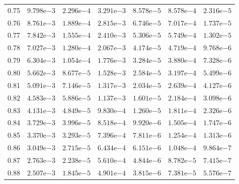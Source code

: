 \begin{table}[htb!]
\begin{tabular}{|c|cc|cc|cc|}
0.75 & $9.798\mathrm{e}{-3}$ & $2.296\mathrm{e}{-4}$ & $3.291\mathrm{e}{-3}$ & $8.578\mathrm{e}{-5}$ & $8.578\mathrm{e}{-4}$ & $2.316\mathrm{e}{-5}$ \\
0.76 & $8.761\mathrm{e}{-3}$ & $1.889\mathrm{e}{-4}$ & $2.815\mathrm{e}{-3}$ & $6.746\mathrm{e}{-5}$ & $7.017\mathrm{e}{-4}$ & $1.737\mathrm{e}{-5}$ \\
0.77 & $7.842\mathrm{e}{-3}$ & $1.555\mathrm{e}{-4}$ & $2.410\mathrm{e}{-3}$ & $5.306\mathrm{e}{-5}$ & $5.749\mathrm{e}{-4}$ & $1.302\mathrm{e}{-5}$ \\
0.78 & $7.027\mathrm{e}{-3}$ & $1.280\mathrm{e}{-4}$ & $2.067\mathrm{e}{-3}$ & $4.174\mathrm{e}{-5}$ & $4.719\mathrm{e}{-4}$ & $9.768\mathrm{e}{-6}$ \\
0.79 & $6.304\mathrm{e}{-3}$ & $1.054\mathrm{e}{-4}$ & $1.776\mathrm{e}{-3}$ & $3.284\mathrm{e}{-5}$ & $3.880\mathrm{e}{-4}$ & $7.328\mathrm{e}{-6}$ \\
0.80 & $5.662\mathrm{e}{-3}$ & $8.677\mathrm{e}{-5}$ & $1.528\mathrm{e}{-3}$ & $2.584\mathrm{e}{-5}$ & $3.197\mathrm{e}{-4}$ & $5.499\mathrm{e}{-6}$ \\
0.81 & $5.091\mathrm{e}{-3}$ & $7.146\mathrm{e}{-5}$ & $1.317\mathrm{e}{-3}$ & $2.034\mathrm{e}{-5}$ & $2.639\mathrm{e}{-4}$ & $4.127\mathrm{e}{-6}$ \\
0.82 & $4.583\mathrm{e}{-3}$ & $5.886\mathrm{e}{-5}$ & $1.137\mathrm{e}{-3}$ & $1.601\mathrm{e}{-5}$ & $2.184\mathrm{e}{-4}$ & $3.098\mathrm{e}{-6}$ \\
0.83 & $4.131\mathrm{e}{-3}$ & $4.849\mathrm{e}{-5}$ & $9.830\mathrm{e}{-4}$ & $1.260\mathrm{e}{-5}$ & $1.811\mathrm{e}{-4}$ & $2.326\mathrm{e}{-6}$ \\
0.84 & $3.729\mathrm{e}{-3}$ & $3.996\mathrm{e}{-5}$ & $8.518\mathrm{e}{-4}$ & $9.920\mathrm{e}{-6}$ & $1.505\mathrm{e}{-4}$ & $1.747\mathrm{e}{-6}$ \\
0.85 & $3.370\mathrm{e}{-3}$ & $3.293\mathrm{e}{-5}$ & $7.396\mathrm{e}{-4}$ & $7.811\mathrm{e}{-6}$ & $1.254\mathrm{e}{-4}$ & $1.313\mathrm{e}{-6}$ \\
0.86 & $3.049\mathrm{e}{-3}$ & $2.715\mathrm{e}{-5}$ & $6.434\mathrm{e}{-4}$ & $6.151\mathrm{e}{-6}$ & $1.048\mathrm{e}{-4}$ & $9.864\mathrm{e}{-7}$ \\
0.87 & $2.763\mathrm{e}{-3}$ & $2.238\mathrm{e}{-5}$ & $5.610\mathrm{e}{-4}$ & $4.844\mathrm{e}{-6}$ & $8.782\mathrm{e}{-5}$ & $7.415\mathrm{e}{-7}$ \\
0.88 & $2.507\mathrm{e}{-3}$ & $1.845\mathrm{e}{-5}$ & $4.901\mathrm{e}{-4}$ & $3.815\mathrm{e}{-6}$ & $7.381\mathrm{e}{-5}$ & $5.576\mathrm{e}{-7}$ \\

\end{tabular}
\end{table}
